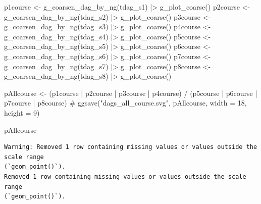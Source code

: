 \documentclass[
  letterpaper,
  DIV=11,
  numbers=noendperiod]{scrartcl}
\newenvironment{Shaded}{\begin{snugshade}}{\end{snugshade}}
\newcommand{\CommentTok}[1]{\textcolor[rgb]{0.37,0.37,0.37}{#1}}
\newcommand{\FunctionTok}[1]{\textcolor[rgb]{0.28,0.35,0.67}{#1}}
\newcommand{\NormalTok}[1]{\textcolor[rgb]{0.00,0.23,0.31}{#1}}
\newcommand{\OtherTok}[1]{\textcolor[rgb]{0.00,0.23,0.31}{#1}}
\newcommand{\SpecialCharTok}[1]{\textcolor[rgb]{0.37,0.37,0.37}{#1}}
\begin{document}
\begin{Shaded}
\begin{Highlighting}[]
\NormalTok{p1course }\OtherTok{\textless{}{-}} \FunctionTok{g\_coarsen\_dag\_by\_ng}\NormalTok{(tdag\_s1) }\SpecialCharTok{|\textgreater{}} \FunctionTok{g\_plot\_coarse}\NormalTok{()}
\NormalTok{p2course }\OtherTok{\textless{}{-}} \FunctionTok{g\_coarsen\_dag\_by\_ng}\NormalTok{(tdag\_s2) }\SpecialCharTok{|\textgreater{}} \FunctionTok{g\_plot\_coarse}\NormalTok{()}
\NormalTok{p3course }\OtherTok{\textless{}{-}} \FunctionTok{g\_coarsen\_dag\_by\_ng}\NormalTok{(tdag\_s3) }\SpecialCharTok{|\textgreater{}} \FunctionTok{g\_plot\_coarse}\NormalTok{()}
\NormalTok{p4course }\OtherTok{\textless{}{-}} \FunctionTok{g\_coarsen\_dag\_by\_ng}\NormalTok{(tdag\_s4) }\SpecialCharTok{|\textgreater{}} \FunctionTok{g\_plot\_coarse}\NormalTok{()}
\NormalTok{p5course }\OtherTok{\textless{}{-}} \FunctionTok{g\_coarsen\_dag\_by\_ng}\NormalTok{(tdag\_s5) }\SpecialCharTok{|\textgreater{}} \FunctionTok{g\_plot\_coarse}\NormalTok{()}
\NormalTok{p6course }\OtherTok{\textless{}{-}} \FunctionTok{g\_coarsen\_dag\_by\_ng}\NormalTok{(tdag\_s6) }\SpecialCharTok{|\textgreater{}} \FunctionTok{g\_plot\_coarse}\NormalTok{()}
\NormalTok{p7course }\OtherTok{\textless{}{-}} \FunctionTok{g\_coarsen\_dag\_by\_ng}\NormalTok{(tdag\_s7) }\SpecialCharTok{|\textgreater{}} \FunctionTok{g\_plot\_coarse}\NormalTok{()}
\NormalTok{p8course }\OtherTok{\textless{}{-}} \FunctionTok{g\_coarsen\_dag\_by\_ng}\NormalTok{(tdag\_s8) }\SpecialCharTok{|\textgreater{}} \FunctionTok{g\_plot\_coarse}\NormalTok{()}

\NormalTok{pAllcourse }\OtherTok{\textless{}{-}}\NormalTok{ (p1course }\SpecialCharTok{|}\NormalTok{ p2course }\SpecialCharTok{|}\NormalTok{ p3course }\SpecialCharTok{|}\NormalTok{ p4course) }\SpecialCharTok{/}\NormalTok{ (p5course }\SpecialCharTok{|}\NormalTok{ p6course }\SpecialCharTok{|}\NormalTok{ p7course }\SpecialCharTok{|}\NormalTok{ p8course)}
\CommentTok{\# ggsave("dags\_all\_course.svg", pAllcourse, width = 18, height = 9)}

\NormalTok{pAllcourse}
\end{Highlighting}
\end{Shaded}

\begin{verbatim}
Warning: Removed 1 row containing missing values or values outside the scale range
(`geom_point()`).
Removed 1 row containing missing values or values outside the scale range
(`geom_point()`).
\end{verbatim}
\end{document}
